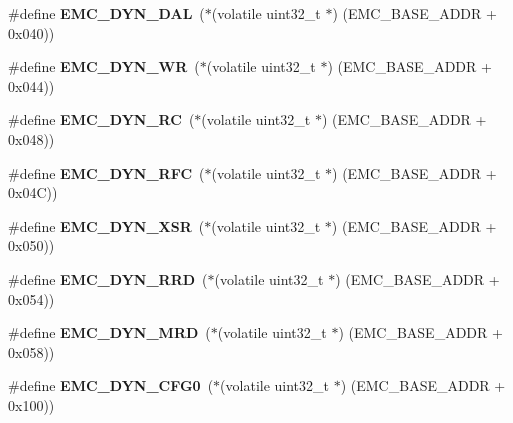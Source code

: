 \begin{DoxyCompactItemize}
\#define {\bfseries E\+M\+C\+\_\+\+D\+Y\+N\+\_\+\+D\+AL}~($\ast$(volatile uint32\+\_\+t $\ast$) (E\+M\+C\+\_\+\+B\+A\+S\+E\+\_\+\+A\+D\+DR + 0x040))
\item 
\mbox{\label{group__lpc24xx__regs_gabef06c16a9efcdf4765e5b2dd40637f6}} 
\#define {\bfseries E\+M\+C\+\_\+\+D\+Y\+N\+\_\+\+WR}~($\ast$(volatile uint32\+\_\+t $\ast$) (E\+M\+C\+\_\+\+B\+A\+S\+E\+\_\+\+A\+D\+DR + 0x044))
\item 
\mbox{\label{group__lpc24xx__regs_ga28e2be038bceabb034266c66ac9f57fc}} 
\#define {\bfseries E\+M\+C\+\_\+\+D\+Y\+N\+\_\+\+RC}~($\ast$(volatile uint32\+\_\+t $\ast$) (E\+M\+C\+\_\+\+B\+A\+S\+E\+\_\+\+A\+D\+DR + 0x048))
\item 
\mbox{\label{group__lpc24xx__regs_ga1b7204cbc3783f01ed351591bd703cbc}} 
\#define {\bfseries E\+M\+C\+\_\+\+D\+Y\+N\+\_\+\+R\+FC}~($\ast$(volatile uint32\+\_\+t $\ast$) (E\+M\+C\+\_\+\+B\+A\+S\+E\+\_\+\+A\+D\+DR + 0x04\+C))
\item 
\mbox{\label{group__lpc24xx__regs_ga65d07637723dad6c4bfa32ca80498da5}} 
\#define {\bfseries E\+M\+C\+\_\+\+D\+Y\+N\+\_\+\+X\+SR}~($\ast$(volatile uint32\+\_\+t $\ast$) (E\+M\+C\+\_\+\+B\+A\+S\+E\+\_\+\+A\+D\+DR + 0x050))
\item 
\mbox{\label{group__lpc24xx__regs_ga7cd5b1acc11e51b2f8c626a68a31fef7}} 
\#define {\bfseries E\+M\+C\+\_\+\+D\+Y\+N\+\_\+\+R\+RD}~($\ast$(volatile uint32\+\_\+t $\ast$) (E\+M\+C\+\_\+\+B\+A\+S\+E\+\_\+\+A\+D\+DR + 0x054))
\item 
\mbox{\label{group__lpc24xx__regs_ga6df89e2d2d9b7bf3a9c2795c878eb876}} 
\#define {\bfseries E\+M\+C\+\_\+\+D\+Y\+N\+\_\+\+M\+RD}~($\ast$(volatile uint32\+\_\+t $\ast$) (E\+M\+C\+\_\+\+B\+A\+S\+E\+\_\+\+A\+D\+DR + 0x058))
\item 
\mbox{\label{group__lpc24xx__regs_gae616731877ae05dafce9414f57a91209}} 
\#define {\bfseries E\+M\+C\+\_\+\+D\+Y\+N\+\_\+\+C\+F\+G0}~($\ast$(volatile uint32\+\_\+t $\ast$) (E\+M\+C\+\_\+\+B\+A\+S\+E\+\_\+\+A\+D\+DR + 0x100))
\item 
\mbox{\label{group__lpc24xx__regs_ga054b22d98d309b3f6339bec6707c520a}} 

\end{DoxyCompactItemize}

